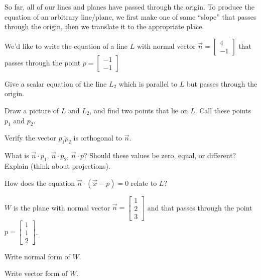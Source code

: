 \documentclass{problemset}
\newcommand{\mat}[1]{\begin{bmatrix}#1\end{bmatrix}}
\begin{document}
	So far, all of our lines and planes have passed through the origin. To 
	produce the equation of an arbitrary line/plane, we first make one of
	same ``slope'' that passes through the origin, then we translate it
	to the appropriate place.

	\question
	We'd like to write the equation of a line $L$ with normal vector
	$\vec n=\begin{bmatrix}4\\-1\end{bmatrix}$ that passes through
	the point $p=\mat{-1\\-1}$

	\begin{parts}
		\item Give a scalar equation of the line $L_2$ which is parallel to $L$
		but passes through the origin.
		\item Draw a picture of $L$ and $L_2$, and find two points that lie on
		$L$.  Call these points $p_1$ and $p_2$.
		\item Verify the vector $\overline {p_1p_2}$ is orthogonal to $\vec n$.
		\item What is $\vec n\cdot p_1$, $\vec n\cdot p_2$, $\vec n\cdot p$?
		Should these values be zero, equal, or different?  Explain (think about
		projections).
		\item How does the equation $\vec n\cdot (\vec x-p)=0$ relate to $L$?
	\end{parts}

	\question
	$W$ is the plane with normal vector $\vec n=\mat{1\\2\\3}$ and that passes through
	the point $p=\mat{1\\1\\2}$.
	\begin{parts}
		\item Write normal form of $W$.
		\item Write vector form of $W$.
	\end{parts}
\end{document}
